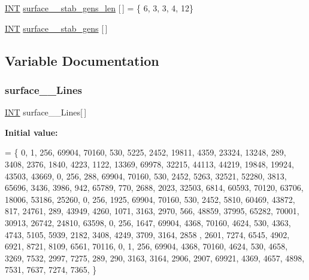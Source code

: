 \begin{DoxyCompactItemize}
\item 
\mbox{\hyperlink{galois_8h_a09fddde158a3a20bd2dcadb609de11dc}{I\+NT}} \mbox{\hyperlink{surface__16_8_c_aaa8be814e9a2d886ff2ddfc693e18d16}{surface\+\_\+\_\+stab\+\_\+gens\+\_\+len}} \mbox{[}$\,$\mbox{]} = \{ 6, 3, 3, 4, 12\}
\item 
\mbox{\hyperlink{galois_8h_a09fddde158a3a20bd2dcadb609de11dc}{I\+NT}} \mbox{\hyperlink{surface__16_8_c_ae4b46e8e2cfc1273ec178287d10765c2}{surface\+\_\+\_\+stab\+\_\+gens}} \mbox{[}$\,$\mbox{]}
\end{DoxyCompactItemize}


\subsection{Variable Documentation}
\mbox{\label{surface__16_8_c_a6bcea8b274d3ae878e0358a5cb0d39d6}} 
\subsubsection{\texorpdfstring{surface\+\_\+\_\+\+Lines}{surface\_16\_Lines}}
{\footnotesize\ttfamily \mbox{\hyperlink{galois_8h_a09fddde158a3a20bd2dcadb609de11dc}{I\+NT}} surface\+\_\+\_\+\+Lines\mbox{[}$\,$\mbox{]}}

{\bfseries Initial value\+:}
\begin{DoxyCode}
= \{ 
    0, 1, 256, 69904, 70160, 530, 5225, 2452, 19811, 4359, 23324, 13248, 289, 3408, 2376, 1840, 4223, 1122,
       13369, 69978, 32215, 44113, 44219, 19848, 19924, 43503, 43669, 
    0, 256, 288, 69904, 70160, 530, 2452, 5263, 32521, 52280, 3813, 65696, 3436, 3986, 942, 65789, 770, 
      2688, 2023, 32503, 6814, 60593, 70120, 63706, 18006, 53186, 25260, 
    0, 256, 1925, 69904, 70160, 530, 2452, 5810, 60469, 43872, 817, 24761, 289, 43949, 4260, 1071, 3163, 
      2970, 566, 48859, 37995, 65282, 70001, 30913, 26742, 24810, 63598, 
    0, 256, 1647, 69904, 4368, 70160, 4624, 530, 4363, 4743, 5105, 5939, 2182, 3408, 4249, 3709, 3164, 2858
      , 2601, 7274, 6545, 4902, 6921, 8721, 8109, 6561, 70116, 
    0, 1, 256, 69904, 4368, 70160, 4624, 530, 4658, 3269, 7532, 2997, 7275, 289, 290, 3163, 3164, 2906, 
      2907, 69921, 4369, 4657, 4898, 7531, 7637, 7274, 7365, 
\}
\end{DoxyCode}
\mbox{\label{surface__16_8_c_ac5e79b43f043b3389e848a13bb577b6c}} 
